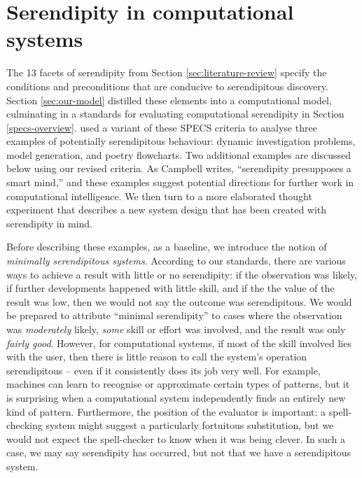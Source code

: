 \section{Serendipity in computational systems} \label{sec:computational-serendipity}

The 13 facets of serendipity from Section \ref{sec:literature-review} specify the
conditions and preconditions that are conducive to serendipitous
discovery.  Section \ref{sec:our-model}
distilled these elements into a computational model,
culminating in a standards for evaluating computational
serendipity in Section \ref{specs-overview}.
 used a variant of these SPECS criteria to
analyse three examples of potentially serendipitous behaviour: dynamic
investigation problems, model generation, and poetry flowcharts.  Two
additional examples are discussed below using our revised criteria.
As Campbell \citeyear{campbell2005serendipity} writes, ``serendipity
presupposes a smart mind,'' and these examples suggest potential
directions for further work in computational intelligence.  We then
turn to a more elaborated thought experiment that describes a new
system design that has been created with serendipity in mind.

Before describing these examples, as a baseline, we introduce the
notion of \emph{minimally serendipitous systems}. According to our
standards, there are various ways to achieve a result with little or no
serendipity: if the observation was likely, if further developments
happened with little skill, and if the the value of the result was
low, then we would not say the outcome was serendipitous.  We would be
prepared to attribute ``minimal serendipity'' to cases where the
observation was \emph{moderately} likely, \emph{some} skill or effort
was involved, and the result was only \emph{fairly good}.  However,
for computational systems, if most of the skill involved lies with the
user, then there is little reason to call the system's operation
serendipitous -- even if it consistently does its job very well.  For
example, machines can learn to recognise or approximate certain types
of patterns, but it is surprising when a computational system
independently finds an entirely new kind of pattern.  Furthermore, the
position of the evaluator is important: a spell-checking system might
suggest a particularly fortuitous substitution, but we would not
expect the spell-checker to know when it was being clever.  In such a
case, we may say serendipity has occurred, but not that we have a
serendipitous system.

